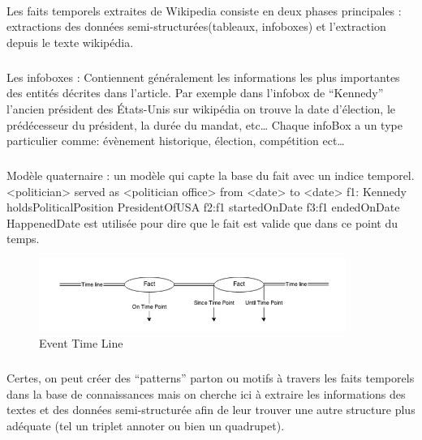 \paragraph{}
Les faits temporels extraites de Wikipedia consiste en deux phases principales : extractions des données semi-structurées(tableaux, infoboxes) et l’extraction depuis le texte wikipédia.
\subparagraph{}
Les infoboxes : Contiennent généralement les informations les plus importantes des entités décrites dans l’article. Par exemple dans l’infobox de “Kennedy” l’ancien président des États-Unis sur wikipédia on trouve la date d’élection, le prédécesseur du président, la durée du mandat, etc…
\newline
Chaque infoBox a un type particulier comme: évènement historique, élection, compétition ect…
\subparagraph{}
Modèle quaternaire : un modèle qui capte la base du fait avec un indice temporel.
\newline
<politician> served as <politician office> from <date> to <date>
\newline
f1: Kennedy holdsPoliticalPosition PresidentOfUSA 
\newline
f2:f1 startedOnDate 
\newline
f3:f1 endedOnDate
\newline
HappenedDate est utilisée pour dire que le fait est valide que dans ce point du temps.
\begin{figure}[H]
        \centering
                \centering
                \includegraphics[width=10cm]{timeline.png}
               \caption{Event Time Line}

\end{figure}
\subparagraph{}
Certes, on peut créer des “patterns” parton ou motifs à travers les faits temporels dans la base de connaissances mais on cherche ici à extraire les informations des textes et des données semi-structurée afin de leur trouver une autre structure plus adéquate (tel un triplet annoter ou bien un quadrupet).